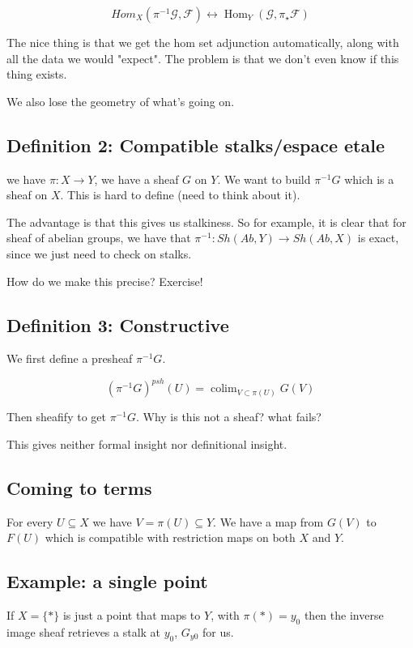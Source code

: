 \documentclass{book}
\newcommand{\Hom}{\operatorname{Hom}}
\newcommand{\F}{\ensuremath{\mathcal{F}}}
\newcommand{\G}{\ensuremath{\mathcal{G}}}
\newcommand{\colim}{\operatorname{colim}}
\newcommand{\inv}{\ensuremath{-1}}
\newcommand{\piinv}{\ensuremath{\pi^\inv}}
\theoremstyle{definition}
\begin{document}
$$Hom_X(\piinv \G, \F) \leftrightarrow \Hom_Y(\G, \pi_\star \F)$$

The nice thing is that we get the hom set adjunction automatically, along
with all the data we would "expect". The problem is that we don't even know
if this thing exists.

We also lose the geometry of what's going on.


\subsection{Definition 2: Compatible stalks/espace etale}

we have $\pi: X \rightarrow Y$, we have a sheaf $G$ on $Y$. We want to build
$\piinv G$ which is a sheaf on $X$. This is hard to define (need to think about it).


The advantage is that this gives us stalkiness. So for example, it is  clear that
for  sheaf of abelian groups, we have that $\piinv: Sh(Ab, Y) \rightarrow Sh(Ab, X)$
is exact, since we just need to check on stalks.


How do we make this precise? Exercise!

\subsection{Definition 3: Constructive}

We first define a presheaf $\piinv G$. 


$$
(\piinv G)^{psh}(U) = \colim_{V \subset \pi(U)} G(V)
$$

Then sheafify to get $\piinv G$. Why is this not a sheaf? what fails?

This gives neither formal insight nor definitional insight.

\subsection{Coming to terms}

For every $U \subseteq X$ we have $V=\pi(U) \subseteq Y$. We have a map
from $G(V)$ to $F(U)$ which is compatible with restriction maps on both
$X$ and $Y$.

\subsection{Example: a single point}

If $X = \{*\}$ is just a point that maps to $Y$, with $\pi(*) = y_0$ 
then the inverse image sheaf retrieves a stalk at $y_0$, $G_{y0}$ for us.
\end{document}
